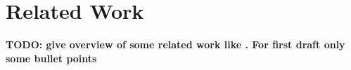 \section{Related Work}
\label{sec:rel_work}

\textbf{TODO: give overview of some related work like \cite{Veys2021}. For first draft only some bullet points}